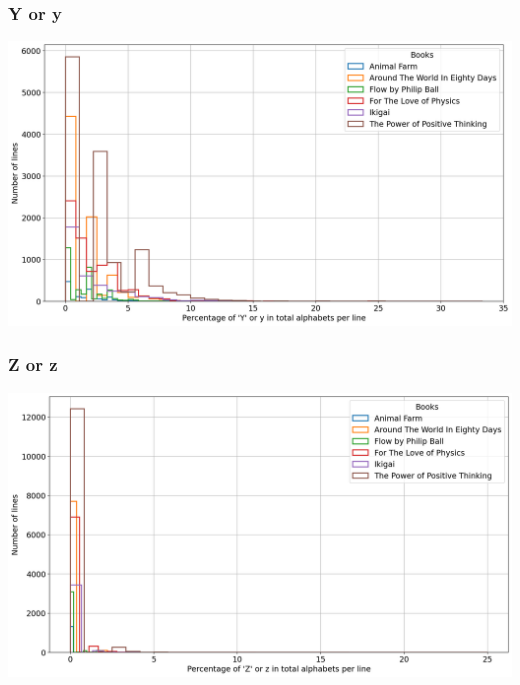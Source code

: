 \begin{frame}
    \frametitle{Y or y}
    \begin{center}
        \hspace*{-5ex}
        \includegraphics[scale=0.35]{../01_programFiles/histograms/y.png}\hspace{10ex}
    \end{center}
\end{frame}

\begin{frame}
    \frametitle{Z or z}
    \begin{center}
        \hspace*{-5ex}
        \includegraphics[scale=0.35]{../01_programFiles/histograms/z.png}\hspace{10ex}
    \end{center}
\end{frame}


